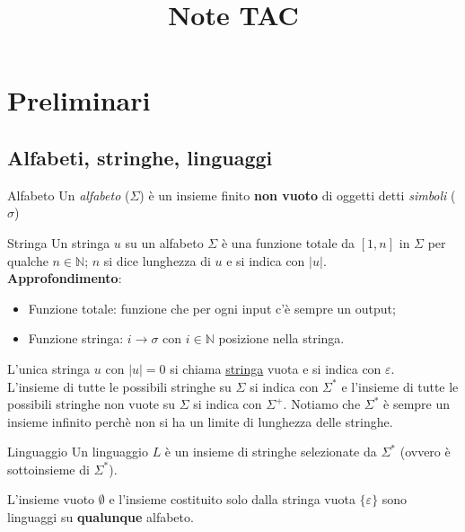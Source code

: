 \documentclass[12pt, a4paper]{report}
\title{Note TAC}
\author{}
\date{}
\begin{document}
\maketitle
\tableofcontents
\chapter{Preliminari}
\section{Alfabeti, stringhe, linguaggi}
    \begin{definitionbox}{Alfabeto}{}
        Un \textit{alfabeto} ($\Sigma$) è un insieme finito \textbf{non vuoto} di oggetti detti \textit{simboli} ($\sigma$)
    \end{definitionbox}
    \begin{definitionbox}{Stringa}{}
        Un stringa $u$ su un alfabeto $\Sigma$ è una funzione totale da $\left[1,n\right]$ in $\Sigma$ per qualche $n\in\mathbb{N}$; $n$ si dice lunghezza di $u$ e si indica con $\left|u\right|$.\\
        \textbf{Approfondimento}:
        \begin{itemize}
            \item Funzione totale: funzione che per ogni input c'è sempre un output;
            \item Funzione stringa: $i\to\sigma$ con $i\in\mathbb{N}$ posizione nella stringa. 
        \end{itemize} 
    \end{definitionbox}
    L'unica stringa $u$ con $\left|u\right|=0$ si chiama \underline{stringa} vuota e si indica con $\varepsilon$.\\
    L'insieme di tutte le possibili stringhe su $\Sigma$ si indica con $\Sigma^*$ e l'insieme di tutte le possibili stringhe non vuote su $\Sigma$ si indica con $\Sigma^+$. Notiamo che $\Sigma^*$ è sempre un insieme infinito perchè non si ha un limite di lunghezza delle stringhe.
    \begin{definitionbox}{Linguaggio}{}
        Un linguaggio $L$ è un insieme di stringhe selezionate da $\Sigma^*$ (ovvero è sottoinsieme di $\Sigma^*$).
    \end{definitionbox}
    L'insieme vuoto $\emptyset$  e l'insieme costituito solo dalla stringa vuota $\{\varepsilon\}$ sono linguaggi su \textbf{qualunque} alfabeto.
    \newpage
\end{document}
